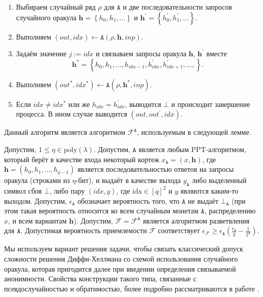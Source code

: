 \documentclass{llncs}
\newcommand{\A}{\texttt{A}}
\begin{document}
\begin{enumerate}[(1)]
\item  Выбираем случайный ряд $\rho$ для $\A$ и две последовательности запросов случайного оракула $\textbf{h} = \left\{h_0, h_1, \ldots\right\}$ и $\textbf{h}^\prime = \left\{h_0^\prime, h_1^\prime, \ldots\right\}$.

\item Выполняем $(out, idx) \leftarrow \A(\rho, \textbf{h}, inp)$.

\item Задаём значение $j := idx$ и связываем запросы оракула $\textbf{h}$, $\textbf{h}^\prime$ вместе \[\textbf{h}^* = \left\{h_0, h_1, \ldots, h_{idx - 1}, h_{idx}^\prime, h_{idx+1}^\prime, \ldots, \right\}.\]

\item Выполняем $(out^*, idx^*) \leftarrow \A(\rho, \textbf{h}^*, inp)$.

\item Если $idx \neq idx^*$ или же $h_{idx} = h_{idx}^\prime$, выводится $\bot$ и происходит завершение процесса. В ином случае выводится $(out, out^\prime, idx)$.
\end{enumerate}

Данный алгоритм является алгоритмом $\mathcal{F}^{\A}$, используемым в следующей лемме.

\begin{lemma}\label{lem:fork}
Допустим, $1 \leq \eta \in \text{poly}(\lambda)$. Допустим, $\A$ является любым PPT-алгоритмом, который берёт в качестве входа некоторый кортеж $x_\A = (x, \textbf{h})$, где $\textbf{h} = (h_0, h_1, \ldots, h_{q-1})$ является последовательностью ответов на запросы оракула (строками из $\eta$-бит), и выдаёт в качестве выхода $y_{\A}$ либо выделенный символ сбоя $\bot$, либо пару $(\textit{idx}, y)$, где $\text{idx} \in [q]^2$ и $y$ являются каким-то выходом. Допустим, $\epsilon_{\A}$ обозначает вероятность того, что $\A$ не выдаёт $\bot_{\A}$ (при этом такая вероятность относится ко всем случайным монетам $\A$, распределению $x$, и всем вариантам $\textbf{h}$). Допустим, $\mathcal{F} = \mathcal{F}^{\A}$ является алгоритмом разветвления для $\A$. Допустимая вероятность приемлемости $\mathcal{F}$ соответствует $\epsilon_{\mathcal{F}} \geq \epsilon_{\A} \left(\frac{\epsilon_{\A}}{q} - \frac{1}{2^\eta}\right)$.
\end{lemma}

Мы используем вариант решения задачи, чтобы связать классический допуск сложности решения Диффи-Хеллмана со схемой использования случайного оракула, которая пригодится далее при введении определения связываемой анонимности. Свойства конструкции такого типа, связанные с псевдослучайностью и обратимостью, более подробно рассматриваются в работе \cite{omniring}.
\end{document}
